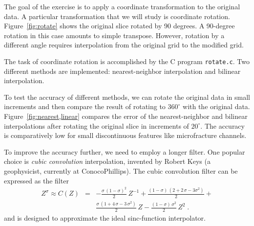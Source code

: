 
The goal of the exercise is to apply a coordinate transformation to
the original data. A particular transformation that we will study is
coordinate rotation. Figure~\ref{fig:rotate} shows the original slice
rotated by 90 degrees. A 90-degree rotation in this case amounts to
simple transpose. However, rotation by a different angle requires
interpolation from the original grid to the modified grid.

The task of coordinate rotation is accomplished by the C program
\texttt{rotate.c}. Two different methods are implemented: 
nearest-neighbor interpolation and bilinear interpolation.

To test the accuracy of different methods, we can rotate the original
data in small increments and then compare the result of rotating to
$360^{\circ}$ with the original data. Figure~\ref{fig:nearest,linear}
compares the error of the nearest-neighbor and bilinear interpolations
after rotating the original slice in increments of $20^{\circ}$. The
accuracy is comparatively low for small discontinuous features like
microfracture channels.

To improve the accuracy further, we need to employ a longer
filter. One popular choice is \emph{cubic convolution} interpolation,
invented by Robert Keys (a geophysicist, currently at ConocoPhillips).
The cubic convolution filter can be expressed as the
filter \cite[]{keys}
\begin{eqnarray}
\nonumber
Z^{\sigma} \approx C(Z) & = & -\frac{\sigma\,(1-\sigma)^2}{2}\,Z^{-1} + 
\frac{(1-\sigma)\,(2 + 2\,\sigma - 3 \sigma^2)}{2} + \\
&  & \frac{\sigma\,(1 + 4\,\sigma - 3\,\sigma^2)}{2}\,Z - \frac{(1-\sigma)\,\sigma^2}{2}\,Z^2\;.
\label{eq:cubic}
\end{eqnarray}
and is designed to approximate the ideal sinc-function interpolator.


\lstset{language=c,numbers=left,numberstyle=\tiny,showstringspaces=false}


\lstset{language=python,numbers=left,numberstyle=\tiny,showstringspaces=false}



